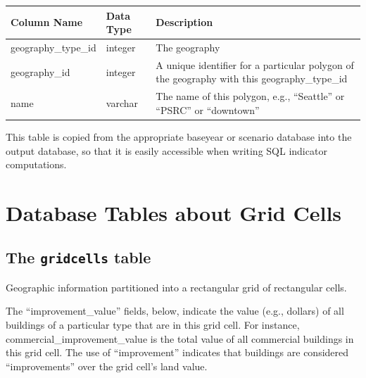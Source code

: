 \begin{tabular}{|l|l|p{4.5in}|}
\hline
\textbf{Column Name} & \textbf{Data Type} & \textbf{Description} \\
\hline
geography_type_id & integer & The geography  \\
\hline
geography_id & integer & A unique identifier for a particular polygon of the geography with this geography_type_id \\
\hline
name & varchar & The name of this polygon, e.g., ``Seattle'' or ``PSRC'' or ``downtown''  \\
\hline

\end{tabular}

This table is copied from the appropriate baseyear or scenario database into
the output database, so that it is easily accessible when writing SQL indicator
computations.

\section{Database Tables about Grid Cells}
\label{sec:gridcell-tables}

\subsection{The {\tt gridcells} table}

Geographic information partitioned into a rectangular grid of rectangular cells.

The ``improvement_value'' fields, below, indicate the value (e.g., dollars) of
all buildings of a particular type that are in this grid cell. For instance,
commercial_improvement_value is the total value of all commercial buildings in
this grid cell. The use of ``improvement'' indicates that buildings are
considered ``improvements'' over the grid cell's land value.

